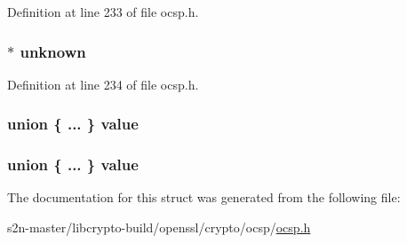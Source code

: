 Definition at line 233 of file ocsp.\+h.

\subsubsection[{\texorpdfstring{unknown}{unknown}}]{$\ast$ unknown}\hypertarget{structocsp__cert__status__st_ad2a115685270cc84356123dde4889a57}{}\label{structocsp__cert__status__st_ad2a115685270cc84356123dde4889a57}


Definition at line 234 of file ocsp.\+h.

\subsubsection[{\texorpdfstring{value}{value}}]{\setlength{\rightskip}{0pt plus 5cm}union \{ ... \}   value}\hypertarget{structocsp__cert__status__st_ad5689ca778bc80fcebad312c59bf8482}{}\label{structocsp__cert__status__st_ad5689ca778bc80fcebad312c59bf8482}
\subsubsection[{\texorpdfstring{value}{value}}]{\setlength{\rightskip}{0pt plus 5cm}union \{ ... \}   value}\hypertarget{structocsp__cert__status__st_adcd04e9e415a78877ab199b1818141c7}{}\label{structocsp__cert__status__st_adcd04e9e415a78877ab199b1818141c7}


The documentation for this struct was generated from the following file\+:\begin{DoxyCompactItemize}
\item 
s2n-\/master/libcrypto-\/build/openssl/crypto/ocsp/\hyperlink{crypto_2ocsp_2ocsp_8h}{ocsp.\+h}\end{DoxyCompactItemize}
